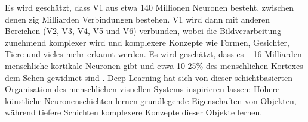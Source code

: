 Es wird geschätzt, dass V1 aus etwa 140 Millionen Neuronen besteht, zwischen denen zig Milliarden Verbindungen bestehen. V1 wird dann mit anderen Bereichen (V2, V3, V4, V5 und V6) verbunden, wobei die Bildverarbeitung zunehmend komplexer wird und komplexere Konzepte wie Formen, Gesichter, Tiere und vieles mehr erkannt werden. Es wird geschätzt, dass es ~ 16 Milliarden menschliche kortikale Neuronen gibt und etwa 10-25\% des menschlichen Kortexes dem Sehen gewidmet sind \cite{Herculano-Houzel2009}. Deep Learning hat sich von dieser schichtbasierten Organisation des menschlichen visuellen Systems inspirieren lassen: Höhere künstliche Neuronenschichten lernen grundlegende Eigenschaften von Objekten, während tiefere Schichten komplexere Konzepte dieser Objekte lernen.


